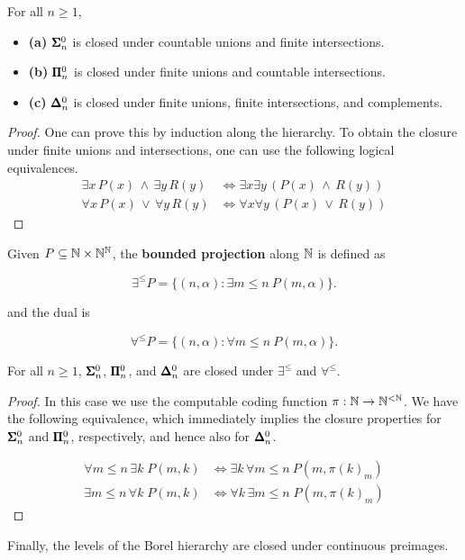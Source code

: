 \begin{proposition}\label{prop-borel-closure-finite}For all $n \geq 1$,

\begin{itemize}
\item \textbf{(a)}  $\pmb{\Sigma}^0_n$ is closed under countable unions and finite intersections.
\item \textbf{(b)} $\pmb{\Pi}^0_n$ is closed under finite unions and countable intersections.
\item \textbf{(c)} $\pmb{\Delta}^0_n$ is closed under finite unions, finite intersections, and complements.
\end{itemize}

\end{proposition}\begin{proof}One can prove this by induction along the hierarchy. To obtain the closure under finite unions and intersections, one can use the following logical equivalences.
\begin{align*}
    \exists x \, P(x) \, \wedge \,  \exists y \, R(y) &\iff \exists x  \exists y \, (P(x) \, \wedge \,  R(y)) \\
    \forall x \, P(x) \, \vee \,  \forall y \, R(y) &\iff  \forall x  \forall y \, (P(x) \, \vee \,  R(y))
\end{align*}
\end{proof}Given $P \subseteq \mathbb{N} \times \mathbb{N}^{\mathbb{N}}$, the \textbf{bounded projection} along $\mathbb{N}$
is defined as

\begin{equation}
\exists^\leq P = \{ (n,\alpha) \colon \exists m \leq n \: P(m,\alpha)\}.
\end{equation}

and the dual is

\begin{equation}
\forall^\leq P = \{ (n,\alpha) \colon \forall m \leq n \: P(m,\alpha)\}.
\end{equation}

\begin{proposition}\label{prop-borel-closure-bounded-projection}For all $n \geq 1$, $\pmb{\Sigma}^0_n$, $\pmb{\Pi}^0_n$, and $\pmb{\Delta}^0_n$ are closed under $\exists^\leq$ and $\forall^\leq$.

\end{proposition}\begin{proof}In this case we use the computable coding function $\pi: \mathbb{N} \to \mathbb{N}^{<\mathbb{N}}$.
We have the following equivalence, which immediately implies the closure properties for $\pmb{\Sigma}^0_n$ and $\pmb{\Pi}^0_n$, respectively, and hence also for $\pmb{\Delta}^0_n$.

\begin{align*}
    \forall m \le n \, \exists k \; P(m,k) &\iff \exists k  \, \forall m \le n \:  P(m,\pi(k)_m)\\
    \exists m \le n  \, \forall k \; P(m,k) &\iff \forall k  \, \exists m \le n \;   P(m,\pi(k)_m)
\end{align*}
\end{proof}Finally, the levels of the Borel hierarchy are closed under continuous preimages.

